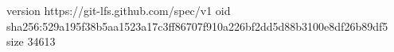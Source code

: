 version https://git-lfs.github.com/spec/v1
oid sha256:529a195f38b5aa1523a17c3ff86707f910a226bf2dd5d88b3100e8df26b89df5
size 34613
